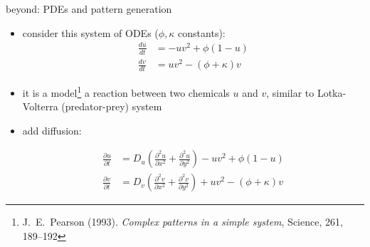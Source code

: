 \documentclass[urlcolor=blue,dvipsnames]{beamer}
\begin{document}
\begin{frame}{beyond: PDEs and pattern generation}

\small
\begin{itemize}
\item consider this system of ODEs ($\phi,\kappa$ constants):
\scriptsize
\begin{align*}
\frac{du}{dt} &= -uv^2+\phi(1-u) \\
\frac{dv}{dt} &= uv^2-(\phi+\kappa)v
\end{align*}
\small
\item it is a model\footnote{\tiny J.~E.~Pearson (1993). \emph{Complex patterns in a simple system}, Science, 261, 189--192} a reaction between two chemicals $u$ and $v$, similar to Lotka-Volterra (predator-prey) system
\item add diffusion:

\vspace{-10mm}
\scriptsize
\begin{align*}
\frac{\partial u}{\partial t} &= D_u \left(\frac{\partial^2 u}{\partial x^2} + \frac{\partial^2 u}{\partial y^2}\right) -uv^2+\phi(1-u) \\
\frac{\partial v}{\partial t} &= D_v \left(\frac{\partial^2 v}{\partial x^2} + \frac{\partial^2 v}{\partial y^2}\right) + uv^2-(\phi+\kappa)v
\end{align*}
\small
\end{itemize}


\end{frame}
\end{document}
